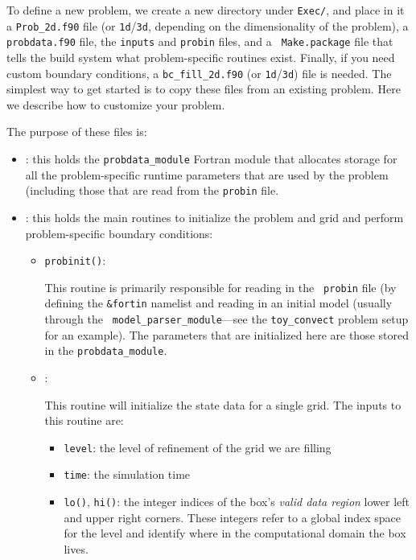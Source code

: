 To define a new problem, we create a new directory under {\tt Exec/},
and place in it a {\tt Prob\_2d.f90} file (or {\tt 1d}/{\tt 3d},
depending on the dimensionality of the problem), a {\tt probdata.f90}
file, the {\tt inputs} and {\tt probin} files, and a {\tt
  Make.package} file that tells the build system what problem-specific
routines exist.  Finally, if you need custom boundary conditions, a
{\tt bc\_fill\_2d.f90} (or {\tt 1d}/{\tt 3d}) file is needed.  The
simplest way to get started is to copy these files from an existing
problem.  Here we describe how to customize your problem.

The purpose of these files is:
\begin{itemize}
\item {}: this holds the {\tt probdata\_module} Fortran module
  that allocates storage for all the problem-specific runtime parameters that
  are used by the problem (including those that are read from the {\tt probin}
  file.

\item {}: this holds the main routines to
  initialize the problem and grid and perform problem-specific boundary
  conditions:

  \begin{itemize}
  \item {\tt probinit()}:

    This routine is primarily responsible for reading in the {\tt
      probin} file (by defining the {\tt \&fortin} namelist and
    reading in an initial model (usually through the {\tt
      model\_parser\_module}---see the {\tt toy\_convect} problem
    setup for an example).  The parameters that are initialized
    here are those stored in the {\tt probdata\_module}.

  \item {}:

    This routine will initialize the state data for a single grid.
    The inputs to this routine are:
    \begin{itemize}
    \item {\tt level}: the level of refinement of the grid we are filling

    \item {\tt time}: the simulation time

    \item {\tt lo()}, {\tt hi()}: the integer indices of the box's {\em
      valid data region} lower left and upper right corners.  These
      integers refer to a global index space for the level and
      identify where in the computational domain the box lives.


\end{itemize}
\end{itemize}
\end{itemize}
